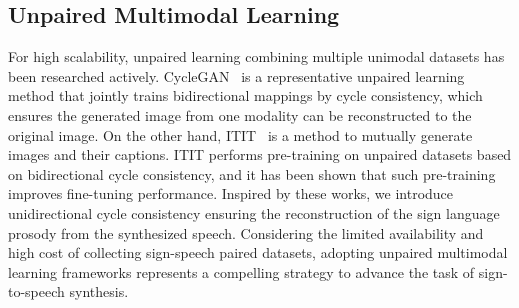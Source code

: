 \subsection{Unpaired Multimodal Learning}
For high scalability, unpaired learning combining multiple unimodal datasets has been researched actively.
CycleGAN~\cite{CycleGAN2017} is a representative unpaired learning method that jointly trains bidirectional mappings by cycle consistency, which ensures the generated image from one modality can be reconstructed to the original image.
On the other hand, ITIT~\cite{li_2023_ICLR} is a method to mutually generate images and their captions. ITIT performs pre-training on unpaired datasets based on bidirectional cycle consistency, and it has been shown that such pre-training improves fine-tuning performance.
Inspired by these works, we introduce unidirectional cycle consistency ensuring the reconstruction of the sign language prosody from the synthesized speech.
Considering the limited availability and high cost of collecting sign-speech paired datasets, adopting unpaired multimodal learning frameworks represents a compelling strategy to advance the task of sign-to-speech synthesis.